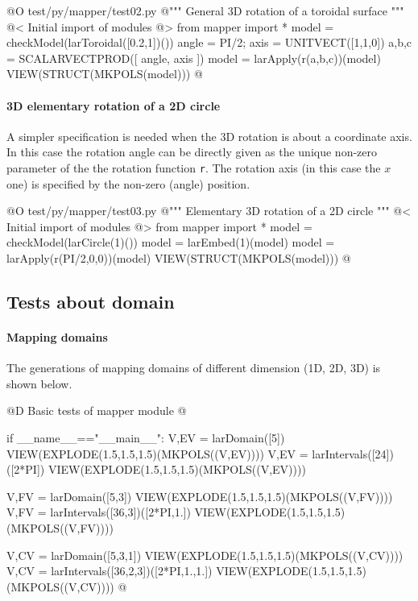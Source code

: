 \documentclass[11pt,oneside]{article}	%
\begin{document}
@O test/py/mapper/test02.py
@{""" General 3D rotation of a toroidal surface """
@< Initial import of modules @>
from mapper import *
model = checkModel(larToroidal([0.2,1])())
angle = PI/2; axis = UNITVECT([1,1,0])
a,b,c = SCALARVECTPROD([ angle, axis ])
model = larApply(r(a,b,c))(model)
VIEW(STRUCT(MKPOLS(model)))
@}


\paragraph{3D elementary rotation of a 2D circle}
A simpler specification is needed when the 3D rotation is about a coordinate axis. In this case the rotation angle can be directly given as the unique non-zero parameter of the the rotation function \texttt{r}. The rotation axis (in this case the $x$ one) is specified by the non-zero (angle) position.

@O test/py/mapper/test03.py
@{""" Elementary 3D rotation of a 2D circle """
@< Initial import of modules @>
from mapper import *
model = checkModel(larCircle(1)())
model = larEmbed(1)(model)
model = larApply(r(PI/2,0,0))(model)
VIEW(STRUCT(MKPOLS(model)))
@}




\subsection{Tests about domain}

\paragraph{Mapping domains}
The generations of mapping domains of different dimension (1D, 2D, 3D) is shown below.
	
@D Basic tests of mapper module
@{if __name__=="__main__":
	V,EV = larDomain([5])
	VIEW(EXPLODE(1.5,1.5,1.5)(MKPOLS((V,EV))))
	V,EV = larIntervals([24])([2*PI])
	VIEW(EXPLODE(1.5,1.5,1.5)(MKPOLS((V,EV))))
		
	V,FV = larDomain([5,3])
	VIEW(EXPLODE(1.5,1.5,1.5)(MKPOLS((V,FV))))
	V,FV = larIntervals([36,3])([2*PI,1.])
	VIEW(EXPLODE(1.5,1.5,1.5)(MKPOLS((V,FV))))
		
	V,CV = larDomain([5,3,1])
	VIEW(EXPLODE(1.5,1.5,1.5)(MKPOLS((V,CV))))
	V,CV = larIntervals([36,2,3])([2*PI,1.,1.])
	VIEW(EXPLODE(1.5,1.5,1.5)(MKPOLS((V,CV))))
@}
\end{document}
